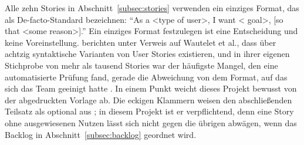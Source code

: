 %
%
%
%
Alle zehn Stories in Abschnitt~\ref{subsec:stories} verwenden ein einziges
Format, das \textcite[p.~383]{lucassen2016} als De-facto-Standard bezeichnen:
\enquote{As a \textless type of user\textgreater, I want \textless
goal\textgreater, [so that \textless some reason\textgreater].} Ein einziges
Format festzulegen ist eine Entscheidung und keine Voreinstellung.
\textcite[p.~384]{lucassen2016}
berichten unter Verweis auf Wautelet et al., dass über achtzig syntaktische
Varianten von User Stories existieren, und in ihrer eigenen Stichprobe von mehr
als tausend Stories \parencite[p.~383]{lucassen2016} war der häufigste Mangel,
den eine automatisierte Prüfung fand, gerade die Abweichung von dem Format, auf
das sich das Team geeinigt hatte
\parencite[p.~397]{lucassen2016}. In einem Punkt weicht dieses Projekt bewusst
von der abgedruckten Vorlage ab. Die eckigen Klammern weisen den abschließenden
Teilsatz als optional aus \parencite[p.~383]{lucassen2016}; in diesem Projekt ist
er verpflichtend, denn eine Story ohne ausgewiesenen Nutzen lässt sich nicht gegen
die übrigen abwägen, wenn das Backlog in Abschnitt~\ref{subsec:backlog} geordnet
wird.



